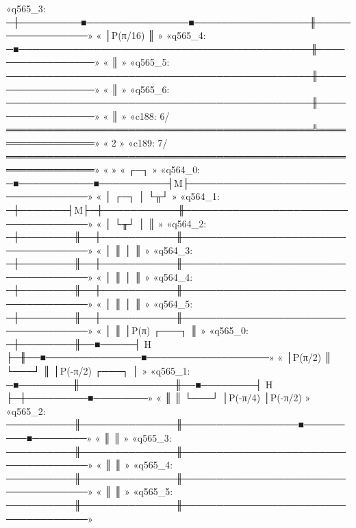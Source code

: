 «q565_3: ─┼─────────■───────────────■─────────────────╫─────────────────»
«         │P(π/16)                                    ║                 »
«q565_4: ─■───────────────────────────────────────────╫─────────────────»
«                                                     ║                 »
«q565_5: ─────────────────────────────────────────────╫─────────────────»
«                                                     ║                 »
«q565_6: ─────────────────────────────────────────────╫─────────────────»
«                                                     ║                 »
«c188: 6/═════════════════════════════════════════════╩═════════════════»
«                                                     2                 »
«c189: 7/═══════════════════════════════════════════════════════════════»
«                                                                       »
«                                ┌─┐                                   »
«q564_0: ─■───────────■──────────┤M├───────────────────────────────────»
«         │       ┌─┐ │          └╥┘                                   »
«q564_1: ─┼───────┤M├─┼───────────╫────────────────────────────────────»
«         │       └╥┘ │           ║                                    »
«q564_2: ─┼────────╫──┼───────────╫────────────────────────────────────»
«         │        ║  │           ║                                    »
«q564_3: ─┼────────╫──┼───────────╫────────────────────────────────────»
«         │        ║  │           ║                                    »
«q564_4: ─┼────────╫──┼───────────╫────────────────────────────────────»
«         │        ║  │           ║                                    »
«q564_5: ─┼────────╫──┼───────────╫────────────────────────────────────»
«         │        ║  │P(π) ┌───┐ ║                                    »
«q565_0: ─┼────────╫──■─────┤ H ├─╫──■──────────────■──────────────────»
«         │P(π/2)  ║        └───┘ ║  │P(-π/2) ┌───┐ │                  »
«q565_1: ─■────────╫──────────────╫──■────────┤ H ├─┼─────────■────────»
«                  ║              ║           └───┘ │P(-π/4)  │P(-π/2) »
«q565_2: ──────────╫──────────────╫─────────────────■─────────■────────»
«                  ║              ║                                    »
«q565_3: ──────────╫──────────────╫────────────────────────────────────»
«                  ║              ║                                    »
«q565_4: ──────────╫──────────────╫────────────────────────────────────»
«                  ║              ║                                    »
«q565_5: ──────────╫──────────────╫────────────────────────────────────»
